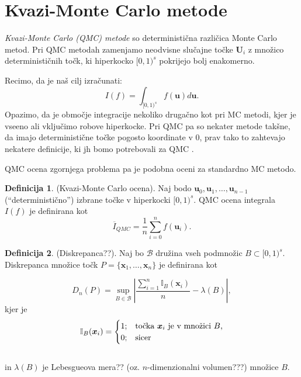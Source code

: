 \documentclass[12pt,a4paper, reqno]{amsart}
\theoremstyle{definition} %
\newtheorem{definicija}{Definicija}[section]
\theoremstyle{plain} %
\newcommand{\U}{\boldsymbol U}
\begin{document}
\vspace{5mm}
\section{Kvazi-Monte Carlo metode}
\vspace{3mm}

\textit{Kvazi-Monte Carlo (QMC) metode} so deterministična različica Monte Carlo metod. Pri QMC metodah zamenjamo neodvisne slučajne točke $\U_i$ z množico determinističnih  točk, ki hiperkocko $[0,1)^s$ pokrijejo bolj enakomerno.

 Recimo, da je naš cilj izračunati:
\[
I(f) = \int_{[0,1)^s} f(\boldsymbol u)d\boldsymbol u.
\] 
Opazimo, da je območje integracije nekoliko drugačno kot pri MC metodi, kjer je vseeno ali vključimo robove hiperkocke. Pri QMC pa so nekater metode takšne, da imajo deterministične točke pogosto koordinate v 0, prav tako to zahtevajo nekatere definicije, ki jh bomo potrebovali za QMC .

QMC ocena zgornjega problema pa je podobna oceni za standardno MC metodo.

\begin{definicija}{(Kvazi-Monte Carlo ocena).} 
Naj bodo $\boldsymbol u_0,\boldsymbol u_1,\ldots,\boldsymbol u_{n-1}$ (``deterministično'') izbrane točke v hiperkocki $[0,1)^s$. QMC ocena integrala $I(f)$ je definirana kot
\[
\overline{I}_{QMC} = \frac{1}{n} \sum_{i=0}^{n} f(\boldsymbol u_i).
\]
\end{definicija}
\vspace{1mm}

\begin{definicija}{(Diskrepanca??)}.
Naj bo $\mathcal{B}$ družina vseh podmnožic $B \subset[0,1)^s$. Diskrepanca množice točk $P = \{\boldsymbol x_1,\ldots,\boldsymbol x_n\}$ je definirana kot

\begin{equation}
D_n(P) =\sup\limits_{B \in \mathcal{B}}\left\lvert\frac{\sum_{i = 1}^n \mathbb {I}_B(\boldsymbol x_i)}{n} - \lambda(B) \right\rvert,
\end{equation}
kjer je 
\vspace{2mm}
\[
\mathbb{I}_B(\boldsymbol x_i) =
  \begin{cases}
  1; & \mbox{točka $\boldsymbol x_i$ je v množici $B$,} \\	
  0; & \mbox{sicer}$$
  \end{cases}
  \] 
  \\[2mm]
 in $\lambda(B)$ je Lebesgueova mera?? (oz. $n$-dimenzionalni volumen???) množice $B$.
\end{definicija}
\end{document}
